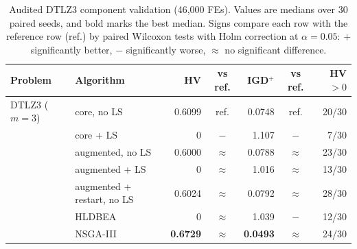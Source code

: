 \begin{table}[!htbp]
\centering
\caption{Audited DTLZ3 component validation (46{,}000 FEs). Values are medians over 30 paired seeds, and bold marks the best median. Signs compare each row with the reference row (ref.) by paired Wilcoxon tests with Holm correction at $\alpha=0.05$: $+$ significantly better, $-$ significantly worse, $\approx$ no significant difference.}
\label{tab:dtlz3_remedy}
\small
\setlength{\tabcolsep}{3pt}
\begin{tabular}{|l|l|r|c|r|c|r|}
\hline
\textbf{Problem} & \textbf{Algorithm} & \textbf{HV} & \textbf{vs ref.} & \textbf{IGD$^+$} & \textbf{vs ref.} & \textbf{HV$>0$} \\ \hline
DTLZ3 ($m=3$) & core, no LS & 0.6099 & ref. & 0.0748 & ref. & 20/30 \\
 & core + LS & 0 & $-$ & 1.107 & $-$ & 7/30 \\
 & augmented, no LS & 0.6000 & $\approx$ & 0.0788 & $\approx$ & 23/30 \\
 & augmented + LS & 0 & $\approx$ & 1.016 & $\approx$ & 13/30 \\
 & augmented + restart, no LS & 0.6024 & $\approx$ & 0.0792 & $\approx$ & 28/30 \\
 & HLDBEA & 0 & $\approx$ & 1.039 & $-$ & 12/30 \\
 & NSGA-III & \textbf{0.6729} & $\approx$ & \textbf{0.0493} & $\approx$ & 24/30 \\
\hline
\end{tabular}
\end{table}
